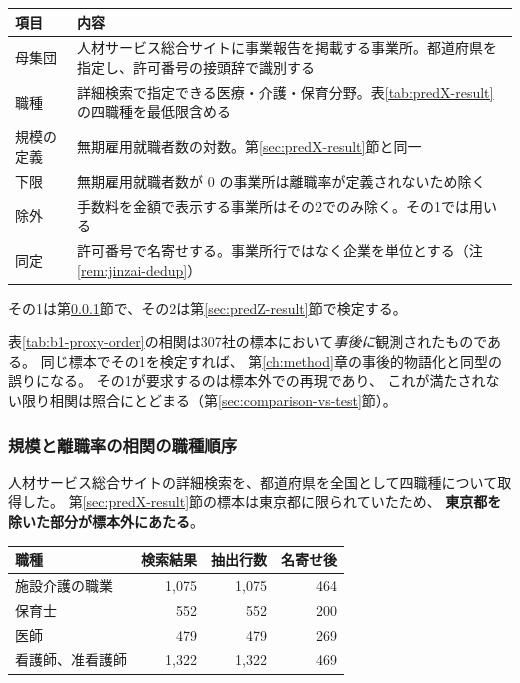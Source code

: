 \begin{center}
\begin{tabularx}{\textwidth}{@{}lX@{}}
\toprule
項目 & 内容 \\
\midrule
母集団 & 人材サービス総合サイトに事業報告を掲載する事業所。都道府県を指定し、許可番号の接頭辞で識別する \\
職種 & 詳細検索で指定できる医療・介護・保育分野。表\ref{tab:predX-result}の四職種を最低限含める \\
規模の定義 & 無期雇用就職者数の対数。第\ref{sec:predX-result}節と同一 \\
下限 & 無期雇用就職者数が 0 の事業所は離職率が定義されないため除く \\
除外 & 手数料を金額で表示する事業所はその2でのみ除く。その1では用いる \\
同定 & 許可番号で名寄せする。事業所行ではなく企業を単位とする（注\ref{rem:jinzai-dedup}） \\
\bottomrule
\end{tabularx}
\label{tab:predYZ-registration}
\end{center}

その1は第\ref{sec:predY-result}節で、その2は第\ref{sec:predZ-result}節で検定する。

\begin{remark}[同一標本で検定してはならない]
\label{rem:no-same-sample-test}
表\ref{tab:b1-proxy-order}の相関は307社の標本において\emph{事後に}観測されたものである。
同じ標本でその1を検定すれば、
第\ref{ch:method}章の事後的物語化と同型の誤りになる。
その1が要求するのは標本外での再現であり、
これが満たされない限り相関は照合にとどまる（第\ref{sec:comparison-vs-test}節）。
\end{remark}

\subsubsection{規模と離職率の相関の職種順序}
\label{sec:predY-result}

人材サービス総合サイトの詳細検索を、都道府県を全国として四職種について取得した。
第\ref{sec:predX-result}節の標本は東京都に限られていたため、
\textbf{東京都を除いた部分が標本外にあたる}。

\begin{center}
\begin{tabular}{@{}lrrr@{}}
\toprule
職種 & 検索結果 & 抽出行数 & 名寄せ後 \\
\midrule
施設介護の職業 & 1,075 & 1,075 & 464 \\
保育士 & 552 & 552 & 200 \\
医師 & 479 & 479 & 269 \\
看護師、准看護師 & 1,322 & 1,322 & 469 \\
\bottomrule
\end{tabular}
\label{tab:predY-sample}
\end{center}

